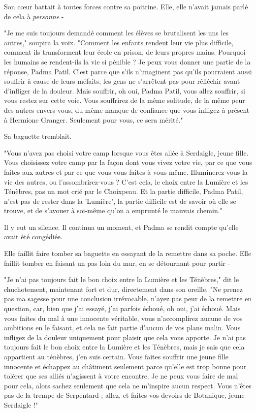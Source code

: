 Son cœur battait à toutes forces contre sa poitrine. Elle, elle n'avait jamais parlé de cela à \emph{personne}  -

"Je me suis toujours demandé comment les élèves se brutalisent les uns les autres," soupira la voix. "Comment les enfants rendent leur vie plus difficile, comment ils transforment leur école en prison, de leurs propres mains. Pourquoi les humains se rendent-ils la vie si pénible ? Je peux vous donner une partie de la réponse, Padma Patil. C'est parce que s'ils n'imaginent pas qu'ils pourraient aussi souffrir à cause de leurs méfaits, les gens ne s'arrêtent pas pour réfléchir avant d'infliger de la douleur. Mais souffrir, oh oui, Padma Patil, vous allez souffrir, si vous restez sur cette voie. Vous souffrirez de la même solitude, de la même peur des autres envers vous, du même manque de confiance que vous infligez à présent à Hermione Granger. Seulement pour vous, ce sera mérité."

Sa baguette tremblait.

"Vous n'avez pas choisi votre camp lorsque vous êtes allée à Serdaigle, jeune fille. Vous choisissez votre camp par la façon dont vous vivez votre vie, par ce que vous faites aux autres et par ce que vous vous faites à vous-même. Illuminerez-vous la vie des autres, ou l'assombrirez-vous ? C'est cela, le choix entre la Lumière et les Ténèbres, pas un mot crié par le Choixpeau. Et la partie difficile, Padma Patil, n'est pas de rester dans la 'Lumière', la partie difficile est de savoir où elle se trouve, et de s'avouer à soi-même qu'on a emprunté le mauvais chemin."

Il y eut un silence. Il continua un moment, et Padma se rendit compte qu'elle avait été congédiée.

Elle faillit faire tomber sa baguette en essayant de la remettre dans sa poche. Elle faillit tomber en faisant un pas loin du mur, en se détournant pour partir -

"Je n'ai pas toujours fait le bon choix entre la Lumière et les Ténèbres," dit le chuchotement, maintenant fort et dur, directement dans son oreille. "Ne prenez pas ma sagesse pour une conclusion irrévocable, n'ayez pas peur de la remettre en question, car, bien que j'ai essayé, j'ai parfois échoué, oh oui, j'ai échoué. Mais vous faites du mal à une innocente véritable, vous n'accomplirez aucune de vos ambitions en le faisant, et cela ne fait partie d'aucun de vos plans malin. Vous infligez de la douleur uniquement pour plaisir que cela vous apporte. Je n'ai pas toujours fait le bon choix entre la Lumière et les Ténèbres, mais je sais que cela appartient au ténèbres, j'en suis certain. Vous faites souffrir une jeune fille innocente et échappez au châtiment seulement parce qu'elle est trop bonne pour tolérer que ses alliés n'agissent à votre encontre. Je ne peux vous faire de mal pour cela, alors sachez seulement que cela ne m'inspire aucun respect. Vous n'êtes pas de la trempe de Serpentard ; allez, et faites vos devoirs de Botanique, jeune Serdaigle !"

